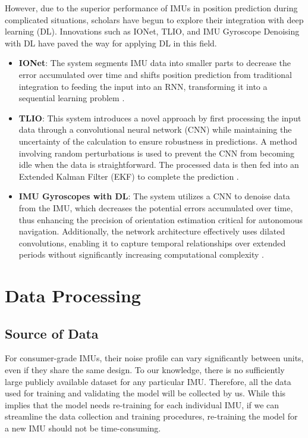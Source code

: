 \documentclass{article} %
\begin{document}
However, due to the superior performance of IMUs in position prediction during complicated situations, scholars have begun to explore their integration with deep learning (DL). Innovations such as IONet, TLIO, and IMU Gyroscope Denoising with DL have paved the way for applying DL in this field.
\begin{itemize}
  \item \textbf{IONet}: The system segments IMU data into smaller parts to decrease the error accumulated over time and shifts position prediction from traditional integration to feeding the input into an RNN, transforming it into a sequential learning problem \citep{10.5555/3504035.3504827}.
  \item \textbf{TLIO}: This system introduces a novel approach by first processing the input data through a convolutional neural network (CNN) while maintaining the uncertainty of the calculation to ensure robustness in predictions. A method involving random perturbations is used to prevent the CNN from becoming idle when the data is straightforward. The processed data is then fed into an Extended Kalman Filter (EKF) to complete the prediction \citep{TLIO}.
  \item \textbf{IMU Gyroscopes with DL}: The system utilizes a CNN to denoise data from the IMU, which decreases the potential errors accumulated over time, thus enhancing the precision of orientation estimation critical for autonomous navigation. Additionally, the network architecture effectively uses dilated convolutions, enabling it to capture temporal relationships over extended periods without significantly increasing computational complexity \citep{brossard2020denoising}.
\end{itemize}

\section{Data Processing}
\subsection{Source of Data}
For consumer-grade IMUs, their noise profile can vary significantly between units, even if they share the same design. To our knowledge, there is no sufficiently large publicly available dataset for any particular IMU. Therefore, all the data used for training and validating the model will be collected by us. While this implies that the model needs re-training for each individual IMU, if we can streamline the data collection and training procedures, re-training the model for a new IMU should not be time-consuming.
\end{document}
